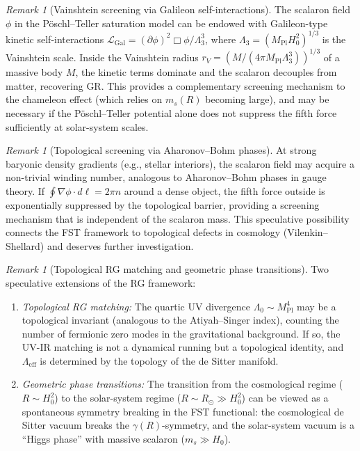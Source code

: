 \documentclass[12pt,a4paper]{article}
\theoremstyle{definition}
\theoremstyle{plain}
\theoremstyle{remark}
\newtheorem{remark}[definition]{Remark}
\begin{document}
\begin{remark}[Vainshtein screening via Galileon self-interactions]
\label{rem:vainshtein}
The scalaron field $\phi$ in the P\"oschl--Teller saturation model can be endowed with Galileon-type kinetic self-interactions $\mathcal{L}_{\mathrm{Gal}} = (\partial\phi)^2 \Box\phi / \Lambda_3^3$, where $\Lambda_3 = (M_{\mathrm{Pl}} H_0^2)^{1/3}$ is the Vainshtein scale. Inside the Vainshtein radius $r_V = (M / (4\pi M_{\mathrm{Pl}} \Lambda_3^3))^{1/3}$ of a massive body $M$, the kinetic terms dominate and the scalaron decouples from matter, recovering GR. This provides a complementary screening mechanism to the chameleon effect (which relies on $m_s(R)$ becoming large), and may be necessary if the P\"oschl--Teller potential alone does not suppress the fifth force sufficiently at solar-system scales.
\end{remark}

\begin{remark}[Topological screening via Aharonov--Bohm phases]
\label{rem:topological-screening}
At strong baryonic density gradients (e.g., stellar interiors), the scalaron field may acquire a non-trivial winding number, analogous to Aharonov--Bohm phases in gauge theory. If $\oint \nabla\phi \cdot d\ell = 2\pi n$ around a dense object, the fifth force outside is exponentially suppressed by the topological barrier, providing a screening mechanism that is independent of the scalaron mass. This speculative possibility connects the FST framework to topological defects in cosmology (Vilenkin--Shellard) and deserves further investigation.
\end{remark}

\begin{remark}[Topological RG matching and geometric phase transitions]
\label{rem:topological-rg}
Two speculative extensions of the RG framework:
\begin{enumerate}
\item \emph{Topological RG matching:} The quartic UV divergence $\Lambda_0 \sim M_{\mathrm{Pl}}^4$ may be a topological invariant (analogous to the Atiyah--Singer index), counting the number of fermionic zero modes in the gravitational background. If so, the UV-IR matching is not a dynamical running but a topological identity, and $\Lambda_{\mathrm{eff}}$ is determined by the topology of the de Sitter manifold.
\item \emph{Geometric phase transitions:} The transition from the cosmological regime ($R \sim H_0^2$) to the solar-system regime ($R \sim R_\odot \gg H_0^2$) can be viewed as a spontaneous symmetry breaking in the FST functional: the cosmological de Sitter vacuum breaks the $\gamma(R)$-symmetry, and the solar-system vacuum is a ``Higgs phase'' with massive scalaron ($m_s \gg H_0$).
\end{enumerate}
\end{remark}
\end{document}
